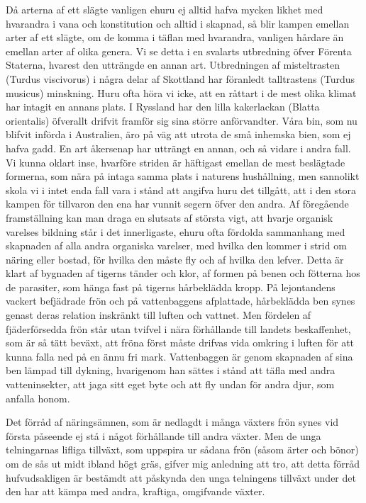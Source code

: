 Då arterna af ett slägte vanligen ehuru ej alltid hafva mycken likhet med hvarandra i vana och konstitution och alltid i skapnad, så blir kampen emellan arter af ett slägte, om de komma i täflan med hvarandra, vanligen hårdare än emellan arter af olika genera. Vi se detta i en svalarts utbredning öfver Förenta Staterna, hvarest den utträngde en annan art. Utbredningen af misteltrasten (Turdus viscivorus) i några delar af Skottland har föranledt talltrastens (Turdus musicus) minskning. Huru ofta höra vi icke, att en råttart i de mest olika klimat har intagit en annans plats. I Ryssland har den lilla kakerlackan (Blatta orientalis) öfverallt drifvit framför sig sina större anförvandter. Våra bin, som nu blifvit införda i Australien, äro på väg att utrota de små inhemska bien, som ej hafva gadd. En art åkersenap har utträngt en annan, och så vidare i andra fall. Vi kunna oklart inse, hvarföre striden är häftigast emellan de mest beslägtade formerna, som nära på intaga samma plats i naturens hushållning, men sannolikt skola vi i intet enda fall vara i stånd att angifva huru det tillgått, att i den stora kampen för tillvaron den ena har vunnit segern öfver den andra.
Af föregående framställning kan man draga en slutsats af största vigt, att hvarje organisk varelses bildning står i det innerligaste, ehuru ofta fördolda sammanhang med skapnaden af alla andra organiska varelser, med hvilka den kommer i strid om näring eller bostad, för hvilka den måste fly och af hvilka den lefver. Detta är klart af bygnaden af tigerns tänder och klor, af formen på benen och fötterna hos de parasiter, som hänga fast på tigerns hårbeklädda kropp. På lejontandens vackert befjädrade frön och på vattenbaggens afplattade, hårbeklädda ben synes genast deras relation inskränkt till luften och vattnet. Men fördelen af fjäderförsedda frön står utan tvifvel i nära förhållande till landets beskaffenhet, som är så tätt beväxt, att fröna först måste drifvas vida omkring i luften för att kunna falla ned på en ännu fri mark. Vattenbaggen är genom skapnaden af sina ben lämpad till dykning, hvarigenom han sättes i stånd att täfla med andra vatteninsekter, att jaga sitt eget byte och att fly undan för andra djur, som anfalla honom.

Det förråd af näringsämnen, som är nedlagdt i många växters frön synes vid första påseende ej stå i något förhållande till andra växter. Men de unga telningarnas lifliga tillväxt, som uppspira ur sådana frön (såsom ärter och bönor) om de sås ut midt ibland högt gräs, gifver mig anledning att tro, att detta förråd hufvudsakligen är bestämdt att påskynda den unga telningens tillväxt under det den har att kämpa med andra, kraftiga, omgifvande växter.

